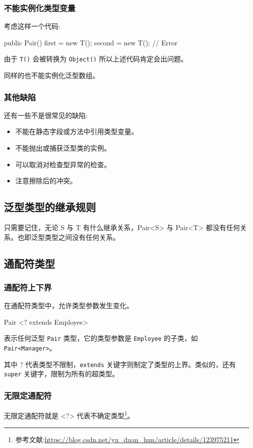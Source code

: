\subsubsection*{不能实例化类型变量}

考虑这样一个代码:
\begin{Java}
public Pair() {first = new T(); second = new T();} // Error
\end{Java}

由于 \texttt{T()} 会被转换为 \texttt{Object()} 所以上述代码肯定会出问题。

同样的也不能实例化泛型数组。

\subsubsection*{其他缺陷}

还有一些不是很常见的缺陷:

\begin{itemize}
    \item 不能在静态字段或方法中引用类型变量。
    \item 不能抛出或捕获泛型类的实例。
    \item 可以取消对检查型异常的检查。
    \item 注意擦除后的冲突。
\end{itemize}

\subsection{泛型类型的继承规则}

只需要记住，无论 S 与 T 有什么继承关系，Pair<S> 与 Pair<T> 都没有任何关系。也即泛型类型之间没有任何关系。

\subsection{通配符类型}

\subsubsection{通配符上下界}

在通配符类型中，允许类型参数发生变化。

\begin{Java}
Pair <? extends Employee>
\end{Java}

表示任何泛型 \texttt{Pair} 类型，它的类型参数是 \texttt{Employee} 的子类，如 \texttt{Pair<Manager>}。

其中 ? 代表类型不限制，\texttt{extends} 关键字则制定了类型的上界。类似的，还有 \texttt{super} 关键字，限制为所有的超类型。

\subsubsection{无限定通配符}

无限定通配符就是 <?> 代表不确定类型\footnote{参考文献:\url{https://blog.csdn.net/yu_duan_hun/article/details/123975211}}。

\newpage